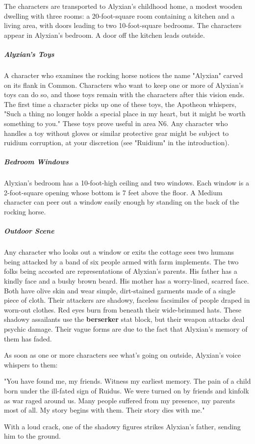 \documentclass[10pt,a4paper,twoside,bg=print,twocolumn,openany,nodeprecatedcode]{dndbook}
\begin{document}
The characters are transported to Alyxian's childhood home, a modest wooden dwelling with three rooms: a 20-foot-square room containing a kitchen and a living area, with doors leading to two 10-foot-square bedrooms. The characters appear in Alyxian's bedroom. A door off the kitchen leads outside.

\subparagraph{Alyxian's Toys}
A character who examines the rocking horse notices the name "Alyxian" carved on its flank in Common. Characters who want to keep one or more of Alyxian's toys can do so, and those toys remain with the characters after this vision ends. The first time a character picks up one of these toys, the Apotheon whispers, "Such a thing no longer holds a special place in my heart, but it might be worth something to you." These toys prove useful in area N6. Any character who handles a toy without gloves or similar protective gear might be subject to ruidium corruption, at your discretion (see "Ruidium" in the introduction).

\subparagraph{Bedroom Windows}
Alyxian's bedroom has a 10-foot-high ceiling and two windows. Each window is a 2-foot-square opening whose bottom is 7 feet above the floor. A Medium character can peer out a window easily enough by standing on the back of the rocking horse.

\subparagraph{Outdoor Scene}
Any character who looks out a window or exits the cottage sees two humans being attacked by a band of six people armed with farm implements. The two folks being accosted are representations of Alyxian's parents. His father has a kindly face and a bushy brown beard. His mother has a worry-lined, scarred face. Both have olive skin and wear simple, dirt-stained garments made of a single piece of cloth. Their attackers are shadowy, faceless facsimiles of people draped in worn-out clothes. Red eyes burn from beneath their wide-brimmed hats. These shadowy assailants use the \textbf{berserker} stat block, but their weapon attacks deal psychic damage. Their vague forms are due to the fact that Alyxian's memory of them has faded.

As soon as one or more characters see what's going on outside, Alyxian's voice whispers to them:

\begin{DndReadAloud}{}
"You have found me, my friends. Witness my earliest memory. The pain of a child born under the ill-fated sign of Ruidus. We were turned on by friends and kinfolk as war raged around us. Many people suffered from my presence, my parents most of all. My story begins with them. Their story dies with me."

With a loud crack, one of the shadowy figures strikes Alyxian's father, sending him to the ground.

\end{DndReadAloud}
\end{document}
